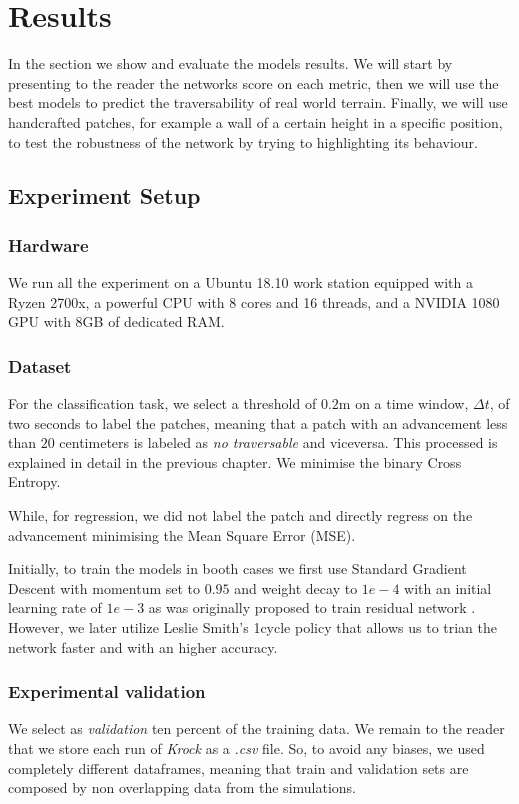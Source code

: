 \documentclass[../document.tex]{subfiles}
\begin{document}
\section{Results}
In the section we show and evaluate the models results. We will start by presenting to the reader the networks score on each metric, then we will use the best models to predict the traversability of real world terrain. Finally, we will use handcrafted patches, for example a wall of a certain height in a specific position, to test the robustness of the network by trying to highlighting its behaviour.
\subsection{Experiment Setup}
\subsubsection{Hardware}
We run all the experiment on a Ubuntu 18.10  work station equipped with a Ryzen 2700x, a powerful CPU with 8 cores and 16 threads, and a NVIDIA 1080 GPU with 8GB of dedicated RAM.
\subsubsection{Dataset}
For the classification task, we select a threshold of $0.2$m on a time window, $\Delta t$, of two seconds to label the patches, meaning that a patch with an advancement less than $20$ centimeters is labeled as \emph{no traversable} and viceversa. This processed is explained in detail in the previous chapter. We minimise the binary Cross Entropy. 

While, for regression, we did not label the patch and directly regress on the advancement  minimising the Mean Square Error (MSE). 

Initially, to train the models in booth cases we first use Standard Gradient Descent with momentum set to $0.95$ and weight decay to $1e-4$ with an initial learning rate of $1e-3$ as was originally proposed to train residual network \cite{he2015deep}. However, we later utilize Leslie Smith's 1cycle policy \cite{1cycle} that allows us to trian the network faster and with an higher accuracy.
\subsubsection{Experimental validation}
We select as \emph{validation} ten percent of the training data. We remain to the reader that we store each run of \emph{Krock} as a \emph{.csv} file. So, to avoid any biases, we used completely different dataframes, meaning that train and validation sets are composed by non overlapping data from the simulations.
\end{document}
